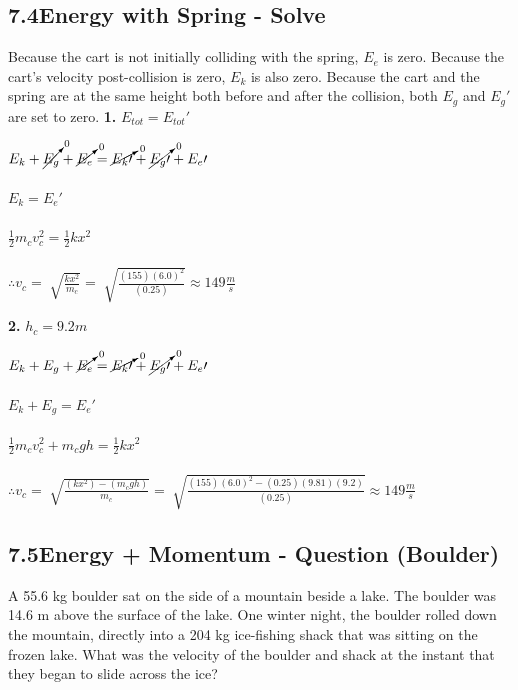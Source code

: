 \documentclass{article}
\begin{document}
\begin{adjustwidth}{1cm}{0pt}
    \subsection*{7.4\hspace*{0.5cm}Energy with Spring - Solve}
    Because the cart is not initially colliding with the spring, $E_{e}$ is zero. Because the cart's velocity post-collision is zero, $E_{k}$ is also zero. Because the cart and the spring are at the same height both before and after the collision, both $E_{g}$ and $E_{g}\prime$ are set to zero.\newline\newline
    \textbf{1.} $E_{tot} = E_{tot}\prime$ \\
    \begin{adjustwidth}{0.6cm}{0pt}
        $E_{k} + \cancelto{0}{E_{g}} + \cancelto{0}{E_{e}} = \cancelto{0}{E_{k}\prime} + \cancelto{0}{E_{g}\prime} + E_{e}\prime$ \\\\
        $E_{k} = E_{e}\prime$ \\\\
        $\frac{1}{2}m_{c}v_{c}^2 = \frac{1}{2}kx^2$ \\\\
        $\therefore v_{c} = \sqrt[]{\frac{kx^2}{m_{c}}} = \sqrt[]{\frac{(155){(6.0)}^2}{(0.25)}} \approx 149\frac{m}{s}$
    \end{adjustwidth}\vspace*{15pt}
    \textbf{2.} $h_{c} = 9.2m$ \\
    \begin{adjustwidth}{0.6cm}{0pt}
        $E_{k} + E_{g} + \cancelto{0}{E_{e}} = \cancelto{0}{E_{k}\prime} + \cancelto{0}{E_{g}\prime} + E_{e}\prime$ \\\\
        $E_{k} + E_{g} = E_{e}\prime$ \\\\
        $\frac{1}{2}m_{c}v_{c}^2 + m_{c}gh = \frac{1}{2}kx^2$ \\\\
        $\therefore v_{c} = \sqrt[]{\frac{(kx^2) - (m_{c}gh)}{m_{c}}} = \sqrt[]{\frac{(155){(6.0)}^2 - (0.25)(9.81)(9.2)}{(0.25)}} \approx 149\frac{m}{s}$
    \end{adjustwidth}\vspace*{15pt}


    \subsection*{7.5\hspace*{0.5cm}Energy + Momentum - Question (Boulder)}
    A 55.6 kg boulder sat on the side of a mountain beside a lake. The boulder was 14.6 m
    above the surface of the lake. One winter
    night, the boulder rolled down the mountain,
    directly into a 204 kg ice-fishing shack that
    was sitting on the frozen lake. What was the
    velocity of the boulder and shack at the
    instant that they began to slide across the
    ice?

\end{adjustwidth}
\end{document}
